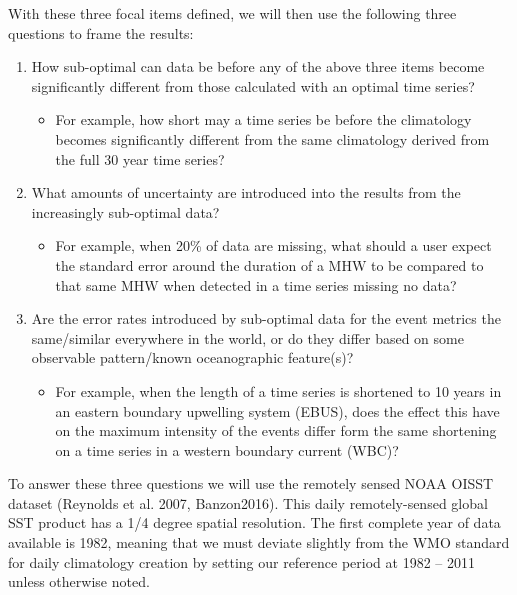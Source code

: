 \documentclass[]{article}
\providecommand{\tightlist}{%
  \setlength{\itemsep}{0pt}\setlength{\parskip}{0pt}}
\begin{document}
With these three focal items defined, we will then use the following
three questions to frame the results:

\begin{enumerate}
\def\labelenumi{\arabic{enumi})}
\tightlist
\item
  How sub-optimal can data be before any of the above three items become
  significantly different from those calculated with an optimal time
  series?

  \begin{itemize}
  \tightlist
  \item
    For example, how short may a time series be before the climatology
    becomes significantly different from the same climatology derived
    from the full 30 year time series?
  \end{itemize}
\item
  What amounts of uncertainty are introduced into the results from the
  increasingly sub-optimal data?

  \begin{itemize}
  \tightlist
  \item
    For example, when 20\% of data are missing, what should a user
    expect the standard error around the duration of a MHW to be
    compared to that same MHW when detected in a time series missing no
    data?
  \end{itemize}
\item
  Are the error rates introduced by sub-optimal data for the event
  metrics the same/similar everywhere in the world, or do they differ
  based on some observable pattern/known oceanographic feature(s)?

  \begin{itemize}
  \tightlist
  \item
    For example, when the length of a time series is shortened to 10
    years in an eastern boundary upwelling system (EBUS), does the
    effect this have on the maximum intensity of the events differ form
    the same shortening on a time series in a western boundary current
    (WBC)?
  \end{itemize}
\end{enumerate}

To answer these three questions we will use the remotely sensed NOAA
OISST dataset (Reynolds et al. 2007, Banzon2016). This daily
remotely-sensed global SST product has a 1/4 degree spatial resolution.
The first complete year of data available is 1982, meaning that we must
deviate slightly from the WMO standard for daily climatology creation by
setting our reference period at 1982 -- 2011 unless otherwise noted.
\end{document}
